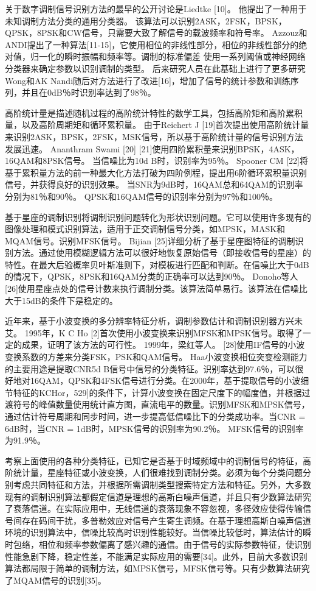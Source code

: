 关于数字调制信号识别方法的最早的公开讨论是Liedtke [10]。 他提出了一种用于未知调制方法分类的通用分类器。 该算法可以识别2ASK，2FSK，BPSK，QPSK，8PSK和CW信号，只需要大致了解信号的载波频率和符号率。 Azzouz和ANDI提出了一种算法[11-15]，它使用相位的非线性部分，相位的非线性部分的绝对值，归一化的瞬时振幅和频率等。调制的标准偏差 使用一系列阈值或神经网络分类器来确定参数以识别调制的类型。 后来研究人员在此基础上进行了更多研究 Wong和AK Nandi随后对方法进行了改进[16]，增加了信号的统计参数和训练序列，并且在0dB％时识别率达到了98％。\par
高阶统计量是描述随机过程的高阶统计特性的数学工具，包括高阶矩和高阶累积量，以及高阶周期矩和循环累积量。 由于Reichert J [19]首次提出使用高阶统计量来识别2ASK，BPSK，2FSK，MSK信号，所以基于高阶统计量的信号识别方法发展迅速。 Ananthram Swami [20] [21]使用四阶累积量来识别BPSK，4ASK，16QAM和8PSK信号。 当信噪比为10d B时，识别率为95％。 Spooner CM [22]将基于累积量方法的前一种最大化方法打破为四阶例程，提出用6阶循环累积量识别信号，并获得良好的识别效果。 当SNR为9dB时，16QAM总和64QAM的识别率分别为81％和90％。 QPSK和16QAM信号的识别率分别为97％和100％。\par

基于星座的调制识别将调制识别问题转化为形状识别问题。它可以使用许多现有的图像处理和模式识别算法，适用于正交调制信号分类，如MPSK，MASK和MQAM信号。识别MFSK信号。 Bijian [25]详细分析了基于星座图特征的调制识别方法。通过使用模糊逻辑方法可以很好地恢复原始信号（即接收信号的星座）的特性。在最大后验概率贝叶斯准则下，对模板进行匹配和判断。在信噪比大于0dB的情况下，QPSK，8PSK和16QAM分类的正确率可以达到90％。 Donoho等人[26]使用星座点处的信号计数来执行调制分类。该算法简单易行。该算法在信噪比大于15dB的条件下是稳定的。\par

近年来，基于小波变换的多分辨率特征分析，调制参数估计和调制识别器方兴未艾。 1995年，K C Ho [2]首次使用小波变换来识别MFSK和MPSK信号。取得了一定的成果，证明了该方法的可行性。 1999年，梁红等人。 [28]使用IF信号的小波变换系数的方差来分类FSK，PSK和QAM信号。 Haa小波变换相位突变检测能力的主要用途是提取CNR5d B信号中信号的分类特征。识别率达到97.6％，可以很好地对16QAM，QPSK和4FSK信号进行分类。在2000年，基于提取信号的小波细节特征的KCHor，529]的条件下，计算小波变换在固定尺度下的幅度值，并根据过渡符号的峰值数量使用统计直方图，直流电平的数量。识别MFSK和MPSK信号，通过估计符号周期和同步时间，进一步提高低信噪比下的分类成功率。当CNR = 6dB时，当CNR = 1dB时，MPSK信号的识别率为90.2％。 MFSK信号的识别率为91.9％。\par
 
考察上面使用的各种分类特征，已知它是否基于时域频域中的调制信号的特征，高阶统计量，星座特征或小波变换，人们很难找到调制分类。必须为每个分类问题分别考虑共同特征和方法，并根据所需调制类型搜索特定方法和特征。另外，大多数现有的调制识别算法都假定信道是理想的高斯白噪声信道，并且只有少数算法研究了衰落信道。在实际应用中，无线信道的衰落现象不容忽视，多径效应使得传输信号间存在码间干扰，多普勒效应对信号产生寄生调频。在基于理想高斯白噪声信道环境的识别算法中，信噪比较高时识别性能较好。当信噪比较低时，算法估计的瞬时包络，相位和频率参数偏离了感兴趣的通信。由于信号的实际参数特征，使识别性能急剧下降，稳定性差，不能满足实际应用的需要[34]。此外，目前大多数识别算法都局限于简单的调制方法，如MPSK信号，MFSK信号等。只有少数算法研究了MQAM信号的识别[35]。\par

